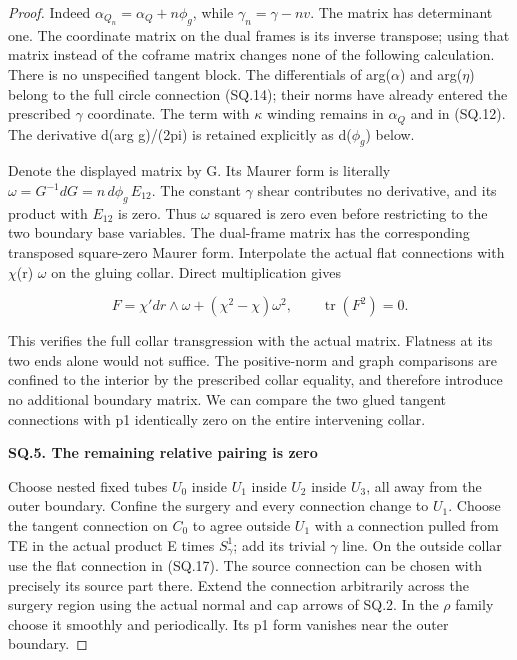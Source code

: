 \begin{proof}
Indeed \(\alpha_{Q_n}=\alpha_Q+n\phi_g\), while \(\gamma_n=\gamma-nv\).
The matrix has determinant one. The coordinate matrix on the dual
frames is its inverse transpose; using that matrix instead of the
coframe matrix changes none of the following calculation. There is
no unspecified tangent block. The differentials of arg(\(\alpha\)) and
arg(\(\eta\)) belong to the full circle connection (SQ.14); their norms
have already entered the prescribed \(\gamma\) coordinate. The term
with \(\kappa\) winding remains in \(\alpha_{Q}\) and in (SQ.12). The derivative
d(arg g)/(2pi) is retained explicitly as d(\(\phi_{g}\)) below.

Denote the displayed matrix by G. Its Maurer form is literally
\(\omega=G^{-1}dG=n\,d\phi_g\,E_{12}\). The constant \(\gamma\) shear contributes
no derivative, and its product with \(E_{12}\) is zero. Thus \(\omega\) squared
is zero even before restricting to the two boundary base variables.
The dual-frame matrix has the corresponding transposed square-zero
Maurer form. Interpolate the actual flat connections with \(\chi\)(r) \(\omega\)
on the gluing collar. Direct multiplication gives

\[
 F=\chi' dr\wedge\omega+(\chi^2-\chi)\omega^2,
 \qquad\operatorname{tr}(F^2)=0.                       \tag{SQ.18a}
\]

This verifies the full collar transgression with the actual matrix.
Flatness at its two ends alone would not suffice. The positive-norm
and graph comparisons are confined to the interior by the prescribed
collar equality, and therefore introduce no additional boundary
matrix. We can compare the two glued tangent connections with p1
identically zero on the entire intervening collar.

\par

\medskip\noindent\textbf{SQ.5. The remaining relative pairing is zero}

\par\nobreak

Choose nested fixed tubes \(U_{0}\) inside \(U_{1}\) inside \(U_{2}\) inside \(U_{3}\), all away
from the outer boundary. Confine the surgery and every connection change
to \(U_{1}\). Choose the tangent connection on \(C_{0}\) to agree outside \(U_{1}\)
with a connection pulled from TE in the actual product E times
\(S^1_\gamma\); add its trivial \(\gamma\) line. On the outside collar use
the flat connection in (SQ.17). The source connection can be
chosen with precisely its source part there. Extend the connection
arbitrarily across the surgery region using the actual normal and
cap arrows of SQ.2. In the \(\rho\) family choose it smoothly and
periodically. Its p1 form vanishes near the outer boundary.


\end{proof}
